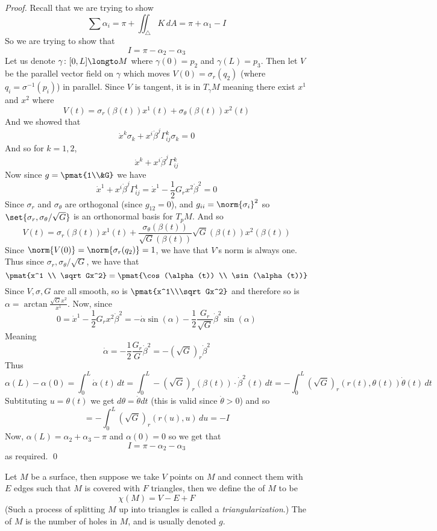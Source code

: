 \begin{proof}
    Recall that we are trying to show
    \[ \sum\alpha_i = \pi + \iint_\triangle K\,dA = \pi + \alpha_1 - I \]
    So we are trying to show that 
    \[ I = \pi - \alpha_2 - \alpha_3 \]
    Let us denote $\gamma\colon[0,L]\longto M$ where $\gamma(0)=p_2$ and $\gamma(L)=p_3$.
    Then let $V$ be the parallel vector field on $\gamma$ which moves $V(0)=\sigma_r(q_2)$ (where $q_i=\sigma^{-1}(p_i)$) in parallel.
    Since $V$ is tangent, it is in $T_\gamma M$ meaning there exist $x^1$ and $x^2$ where
    \[ V(t) = \sigma_r(\beta(t)) x^1(t) + \sigma_\theta(\beta(t)) x^2(t) \]
    And we showed that
    \[ \dot x^k\sigma_k + x^i\dot\beta^j\Gamma_{ij}^k\sigma_k = 0 \]
    And so for $k=1,2$,
    \[ \dot x^k + x^i\dot\beta^j\Gamma_{ij}^k \]
    Now since $g=\pmat{1\\&G}$ we have
    \[ \dot x^1 + x^i\dot\beta^j\Gamma_{ij}^1 = \dot x^1 - \frac12G_rx^2\dot\beta^2 = 0 \]
    Since $\sigma_r$ and $\sigma_\theta$ are orthogonal (since $g_{12}=0$), and $g_{ii}=\norm{\sigma_i}^2$ so $\set{\sigma_r,\sigma_\theta/\sqrt G}$ is an orthonormal basis for $T_pM$.
    And so
    \[ V(t) = \sigma_r(\beta(t))x^1(t) + \frac{\sigma_\theta(\beta(t))}{\sqrt G(\beta(t))}\sqrt G(\beta(t))x^2(\beta(t)) \]
    Since $\norm{V(0)}=\norm{\sigma_r(q_2)}=1$, we have that $V$'s norm is always one.
    Thus since $\sigma_r,\sigma_\theta/\sqrt G$, we have that
    \[ \pmat{x^1 \\ \sqrt Gx^2} = \pmat{\cos(\alpha(t)) \\ \sin(\alpha(t))} \]
    Since $V,\sigma,G$ are all smooth, so is $\pmat{x^1\\\sqrt Gx^2}$ and therefore so is $\alpha=\arctan\frac{\sqrt Gx^2}{x^1}$.
    Now, since
    \[ 0 = \dot x^1 - \frac12G_rx^2\dot\beta^2 =  -\dot\alpha\sin(\alpha) - \frac12\frac{G_r}{\sqrt G}\dot\beta^2\sin(\alpha) \]
    Meaning
    \[ \dot\alpha = -\frac12\frac{G_r}G\dot\beta^2 = -(\sqrt G)_r\dot\beta^2 \]
    Thus
    \[ \alpha(L) - \alpha(0) = \int_0^L \dot\alpha(t)\,dt = \int_0^L -(\sqrt G)_r(\beta(t))\cdot\dot\beta^2(t)\,dt = -\int_0^L (\sqrt G)_r(r(t),\theta(t))\dot\theta(t)\,dt \]
    Subtituting $u=\theta(t)$ we get $d\theta=\dot\theta dt$ (this is valid since $\dot\theta>0$) and so
    \[ = -\int_0^L (\sqrt G)_r(r(u),u)\,du = -I \]
    Now, $\alpha(L)=\alpha_2+\alpha_3-\pi$ and $\alpha(0)=0$ so we get that
    \[ I = \pi - \alpha_2 - \alpha_3 \]
    as required.
    \qed

\end{proof}

\begin{defn*}

    Let $M$ be a surface, then suppose we take $V$ points on $M$ and connect them with $E$ edges such that $M$ is covered with $F$ triangles, then we define the  of $M$ to be
    \[ \chi(M) = V - E + F \]
    (Such a process of splitting $M$ up into triangles is called a \emph{triangularization}.)
    The  of $M$ is the number of holes in $M$, and is usually denoted $g$.

\end{defn*}

